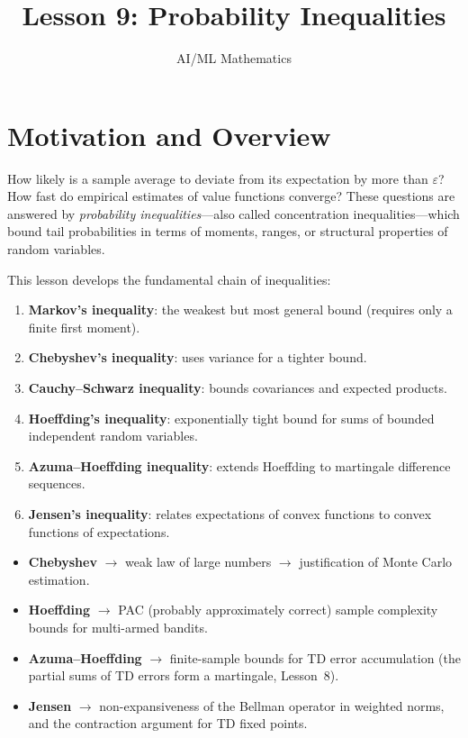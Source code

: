 \documentclass[11pt,a4paper]{article}
\title{Lesson 9: Probability Inequalities}
\author{AI/ML Mathematics}
\date{}
\begin{document}
\maketitle
\tableofcontents
\newpage


\section{Motivation and Overview}
\label{sec:motivation}

How likely is a sample average to deviate from its expectation by
more than $\varepsilon$?  How fast do empirical estimates of value
functions converge?  These questions are answered by
\emph{probability inequalities}---also called concentration
inequalities---which bound tail probabilities in terms of
moments, ranges, or structural properties of random variables.

This lesson develops the fundamental chain of inequalities:
\begin{enumerate}[nosep]
  \item \textbf{Markov's inequality}: the weakest but most
    general bound (requires only a finite first moment).
  \item \textbf{Chebyshev's inequality}: uses variance for a
    tighter bound.
  \item \textbf{Cauchy--Schwarz inequality}: bounds covariances
    and expected products.
  \item \textbf{Hoeffding's inequality}: exponentially tight
    bound for sums of bounded independent random variables.
  \item \textbf{Azuma--Hoeffding inequality}: extends Hoeffding
    to martingale difference sequences.
  \item \textbf{Jensen's inequality}: relates expectations of
    convex functions to convex functions of expectations.
\end{enumerate}

\begin{rlconnection}[title={Why This Matters for RL}]
\begin{itemize}[nosep]
  \item \textbf{Chebyshev} $\to$ weak law of large numbers
    $\to$ justification of Monte Carlo estimation.
  \item \textbf{Hoeffding} $\to$ PAC (probably approximately
    correct) sample complexity bounds for multi-armed bandits.
  \item \textbf{Azuma--Hoeffding} $\to$ finite-sample bounds for
    TD error accumulation (the partial sums of TD errors form a
    martingale, Lesson~8).
  \item \textbf{Jensen} $\to$ non-expansiveness of the Bellman
    operator in weighted norms, and the contraction argument for
    TD fixed points.
\end{itemize}
\end{rlconnection}
\end{document}
